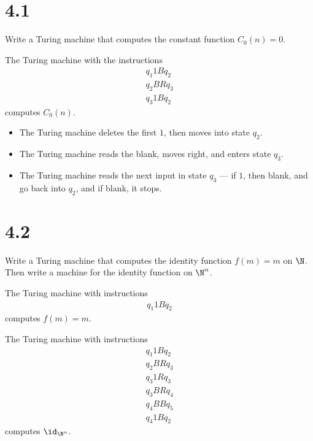 \documentclass[12pt]{mypackage}
\begin{document}
\RaggedRight
\section{4.1}%
\begin{problem}
  Write a Turing machine that computes the constant function $C_0(n) = 0$.
\end{problem}
\begin{solution}
  The Turing machine with the instructions
  \begin{align*}
    q_1 1 B q_2\\
    q_2 B R q_3\\
    q_3 1 B q_2
  \end{align*}
  computes $C_0(n)$.
  \begin{itemize}
    \item The Turing machine deletes the first $1$, then moves into state $q_2$.
    \item The Turing machine reads the blank, moves right, and enters state $q_3$.
    \item The Turing machine reads the next input in state $q_3$ --- if $1$, then blank, and go back into $q_2$, and if blank, it stops.
  \end{itemize}
\end{solution}
\section{4.2}%
\begin{problem}
  Write a Turing machine that computes the identity function $f(m) = m$ on $\N$. Then write a machine for the identity function on $\N^{n}$.
\end{problem}
\begin{solution}
  The Turing machine with instructions
  \begin{align*}
    q_1 1 B q_2
  \end{align*}
  computes $f(m) = m$.\newline

  The Turing machine with instructions
  \begin{align*}
    q_1 1 B q_2\\
    q_2 B R q_3\\
    q_3 1 R q_3\\
    q_3 B R q_4\\
    q_4 B B q_5\\
    q_4 1 B q_2
  \end{align*}
  computes $\id_{\N^{n}}$.
\end{solution}
\end{document}
